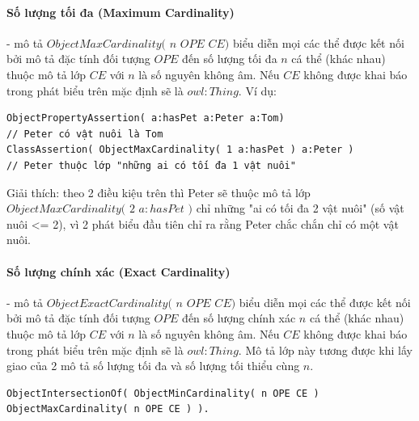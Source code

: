 \paragraph{Số lượng tối đa (Maximum Cardinality)} - mô tả $ ObjectMaxCardinality($ $n$ $OPE$  $CE)$ biểu diễn mọi các thể được kết nối bởi mô tả đặc tính đối tượng $OPE$ đến số lượng tối đa $n$ cá thể (khác nhau) thuộc mô tả lớp $CE$ với $n$ là số nguyên không âm. Nếu $CE$ không được khai báo trong phát biểu trên mặc định sẽ là $owl:Thing$. Ví dụ:
\begin{verbatim}
ObjectPropertyAssertion( a:hasPet a:Peter a:Tom)
// Peter có vật nuôi là Tom
ClassAssertion( ObjectMaxCardinality( 1 a:hasPet ) a:Peter )
// Peter thuộc lớp "những ai có tối đa 1 vật nuôi"
\end{verbatim}
Giải thích: theo 2 điều kiệu trên thì Peter sẽ thuộc mô tả lớp $ObjectMaxCardinality($ $2$ $a:hasPet$ $)$ chỉ những "ai có tối đa 2 vật nuôi" (số vật nuôi <= 2), vì 2 phát biểu đầu tiên chỉ ra rằng Peter chắc chắn chỉ có một vật nuôi.

\paragraph{Số lượng chính xác (Exact Cardinality)} - mô tả $ObjectExactCardinality($ $n$ $OPE$  $CE)$ biểu diễn mọi các thể được kết nối bởi mô tả đặc tính đối tượng $OPE$ đến số lượng chính xác $n$ cá thể (khác nhau) thuộc mô tả lớp $CE$ với $n$ là số nguyên không âm. Nếu $CE$ không được khai báo trong phát biểu trên mặc định sẽ là $owl:Thing$. Mô tả lớp này tương được khi lấy giao của 2 mô tả số lượng tối đa và số lượng tối thiểu cùng $n$.
\begin{verbatim}
ObjectIntersectionOf( ObjectMinCardinality( n OPE CE ) 
ObjectMaxCardinality( n OPE CE ) ).
\end{verbatim}

